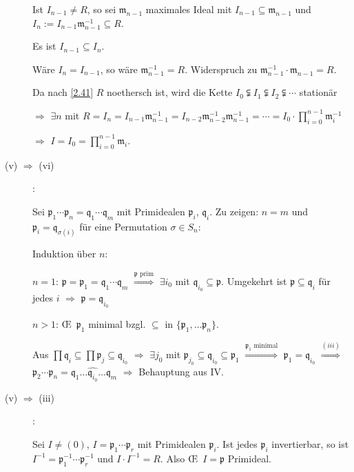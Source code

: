 \begin{Bew}
\begin{description}
Ist $I_{n-1} \neq R$, so sei $\mathfrak{m}_{n-1}$ maximales Ideal mit $I_{n-1} \subseteq \mathfrak{m}_{n-1}$ und $I_n := I_{n-1} \mathfrak{m}_{n-1}^{-1} \subseteq R$.

Es ist $I_{n-1} \subseteq I_n$.

W\"are $I_n = I_{n-1}$, so w\"are $\mathfrak{m}_{n-1}^{-1} = R$. Widerspruch zu $\mathfrak{m}_{n-1}^{-1} \cdot \mathfrak{m}_{n-1} = R$.

Da nach \ref{2.41} $R$ noethersch ist, wird die Kette $I_0 \subsetneqq I_1 \subsetneqq I_2 \subsetneqq \cdots$ station\"ar

$\Rightarrow$ $\exists n$ mit $R = I_n = I_{n-1} \mathfrak{m}_{n-1}^{-1} = I_{n-2} \mathfrak{m}_{n-2}^{-1} \mathfrak{m}_{n-1}^{-1} = \cdots = I_0 \cdot \prod_{i=0}^{n-1} \mathfrak{m}_{i}^{-1}$

$\Rightarrow$ $I = I_0 = \prod_{i=0}^{n-1} \mathfrak{m}_i$.

\item[(v) $\Rightarrow$ (vi)]:

Sei $\mathfrak{p}_1 \cdots \mathfrak{p}_n = \mathfrak{q}_1 \cdots \mathfrak{q}_m$ mit Primidealen $\mathfrak{p}_i$, $\mathfrak{q}_i$. Zu zeigen: $n=m$ und $\mathfrak{p}_i = \mathfrak{q}_{\sigma(i)}$ f\"ur eine Permutation $\sigma \in S_n$:

Induktion \"uber $n$:

$n=1$: $\mathfrak{p} = \mathfrak{p}_1 = \mathfrak{q}_1 \cdots \mathfrak{q}_m$ $\overset{\mathfrak{p}\text{ prim}}{\Rightarrow}$ $\exists i_0$ mit $\mathfrak{q}_{i_0} \subseteq \mathfrak{p}$. Umgekehrt ist $\mathfrak{p} \subseteq \mathfrak{q}_i$ f\"ur jedes $i$ $\Rightarrow$ $\mathfrak{p} = \mathfrak{q}_{i_0}$

$n>1$: \OE\  $\mathfrak{p}_1$ minimal bzgl. $\subseteq$ in $\{ \mathfrak{p}_1,
\ldots \mathfrak{p}_n \}$.

Aus $\prod \mathfrak{q}_i \subseteq \prod \mathfrak{p}_j \subseteq \mathfrak{q}_{i_0}$ $\Rightarrow$ $\exists j_0$ mit $\mathfrak{p}_{j_0} \subseteq \mathfrak{q}_{i_0} \subseteq \mathfrak{p}_1$ $\overset{\mathfrak{p}_1\text{ minimal}}{\Rightarrow}$ $\mathfrak{p}_1 = \mathfrak{q}_{i_0}$ $\overset{(iii)}{\Rightarrow}$ $\mathfrak{p}_2 \cdots \mathfrak{p}_n = \mathfrak{q}_1 \ldots \widehat{\mathfrak{q}_{i_0}} \ldots \mathfrak{q}_m$ $\Rightarrow$ Behauptung aus IV.

\item[(v) $\Rightarrow$ (iii)]:

Sei $I \neq (0)$, $I = \mathfrak{p}_1 \cdots \mathfrak{p}_r$ mit Primidealen
$\mathfrak{p}_i$. Ist jedes $\mathfrak{p}_i$ invertierbar, so ist $I^{-1} =
\mathfrak{p}_1^{-1} \cdots \mathfrak{p}_r^{-1}$ und $I \cdot I^{-1} = R$. Also
\OE\  $I = \mathfrak{p}$ Primideal.


\end{description}
\end{Bew}
